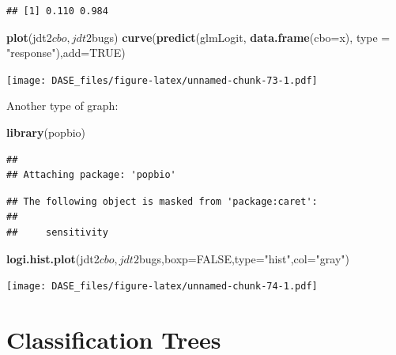 \documentclass[]{book}
\newenvironment{Shaded}{\begin{snugshade}}{\end{snugshade}}
\newcommand{\KeywordTok}[1]{\textcolor[rgb]{0.13,0.29,0.53}{\textbf{{#1}}}}
\newcommand{\DataTypeTok}[1]{\textcolor[rgb]{0.13,0.29,0.53}{{#1}}}
\newcommand{\StringTok}[1]{\textcolor[rgb]{0.31,0.60,0.02}{{#1}}}
\newcommand{\CommentTok}[1]{\textcolor[rgb]{0.56,0.35,0.01}{\textit{{#1}}}}
\newcommand{\OtherTok}[1]{\textcolor[rgb]{0.56,0.35,0.01}{{#1}}}
\newcommand{\NormalTok}[1]{{#1}}
\begin{document}
\begin{verbatim}
## [1] 0.110 0.984
\end{verbatim}

\begin{Shaded}
\begin{Highlighting}[]
\KeywordTok{plot}\NormalTok{(jdt2$cbo,jdt2$bugs)}
\KeywordTok{curve}\NormalTok{(}\KeywordTok{predict}\NormalTok{(glmLogit, }\KeywordTok{data.frame}\NormalTok{(}\DataTypeTok{cbo=}\NormalTok{x), }\DataTypeTok{type =} \StringTok{"response"}\NormalTok{),}\DataTypeTok{add=}\OtherTok{TRUE}\NormalTok{)}
\end{Highlighting}
\end{Shaded}

\texttt{[image: DASE\_files/figure-latex/unnamed-chunk-73-1.pdf]}

\begin{Shaded}
\end{Shaded}

Another type of graph:

\begin{Shaded}
\begin{Highlighting}[]
\KeywordTok{library}\NormalTok{(popbio)}
\end{Highlighting}
\end{Shaded}

\begin{verbatim}
## 
## Attaching package: 'popbio'
\end{verbatim}

\begin{verbatim}
## The following object is masked from 'package:caret':
## 
##     sensitivity
\end{verbatim}

\begin{Shaded}
\begin{Highlighting}[]
\KeywordTok{logi.hist.plot}\NormalTok{(jdt2$cbo,jdt2$bugs,}\DataTypeTok{boxp=}\OtherTok{FALSE}\NormalTok{,}\DataTypeTok{type=}\StringTok{"hist"}\NormalTok{,}\DataTypeTok{col=}\StringTok{"gray"}\NormalTok{)}
\end{Highlighting}
\end{Shaded}

\texttt{[image: DASE\_files/figure-latex/unnamed-chunk-74-1.pdf]}

\section{Classification Trees}\label{classification-trees}
\end{document}
